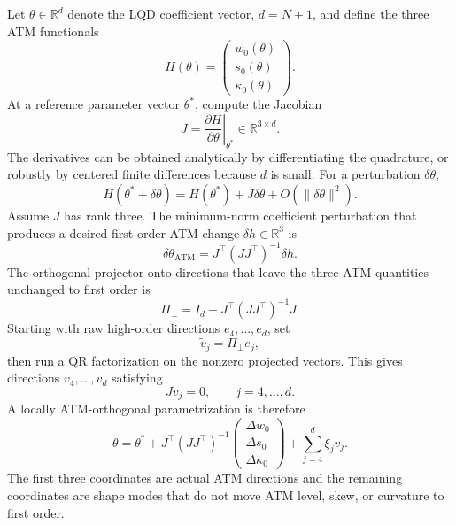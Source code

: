 \documentclass[11pt]{article}
\newcommand{\R}{\mathbb{R}}
\newcommand{\1}{\mathbf{1}}
\begin{document}
Let $\theta\in\R^d$ denote the LQD coefficient vector, $d=N+1$, and define the three ATM functionals
\begin{equation}
    H(\theta)=\begin{pmatrix}w_0(\theta)\\ s_0(\theta)\\ \kappa_0(\theta)\end{pmatrix}.
\end{equation}
At a reference parameter vector $\theta^*$, compute the Jacobian
\begin{equation}
    J=\left.\frac{\partial H}{\partial\theta}\right|_{\theta^*}\in\R^{3\times d}.\label{eq:atm_jacobian}
\end{equation}
The derivatives can be obtained analytically by differentiating the quadrature, or robustly by centered finite differences because $d$ is small.  For a perturbation $\delta\theta$,
\begin{equation}
    H(\theta^*+\delta\theta)=H(\theta^*)+J\delta\theta+O(\|\delta\theta\|^2).
\end{equation}
Assume $J$ has rank three.  The minimum-norm coefficient perturbation that produces a desired first-order ATM change $\delta h\in\R^3$ is
\begin{equation}
    \delta\theta_{\mathrm{ATM}}=J^\top(JJ^\top)^{-1}\delta h.\label{eq:atm_pinv}
\end{equation}
The orthogonal projector onto directions that leave the three ATM quantities unchanged to first order is
\begin{equation}
    \Pi_\perp=I_d-J^\top(JJ^\top)^{-1}J.\label{eq:projector}
\end{equation}
Starting with raw high-order directions $e_4,\ldots,e_d$, set
\begin{equation}
    \widetilde v_j=\Pi_\perp e_j,
\end{equation}
then run a QR factorization on the nonzero projected vectors.  This gives directions $v_4,\ldots,v_d$ satisfying
\begin{equation}
    Jv_j=0,
    \qquad j=4,\ldots,d.
\end{equation}
A locally ATM-orthogonal parametrization is therefore
\begin{equation}
    \theta=\theta^*+J^\top(JJ^\top)^{-1}\begin{pmatrix}\Delta w_0\\ \Delta s_0\\ \Delta\kappa_0\end{pmatrix}
    +\sum_{j=4}^{d}\xi_jv_j. \label{eq:ortho_param}
\end{equation}
The first three coordinates are actual ATM directions and the remaining coordinates are shape modes that do not move ATM level, skew, or curvature to first order.
\end{document}
